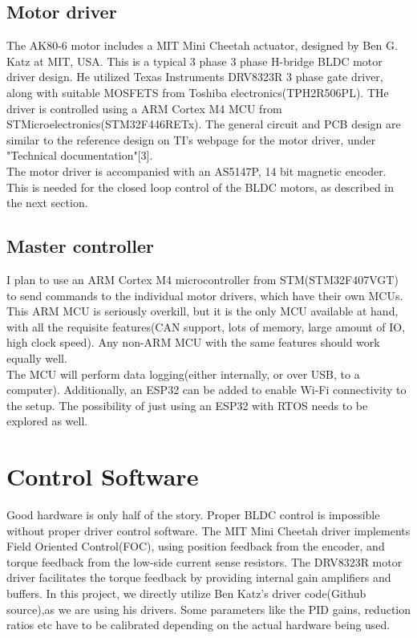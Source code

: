 \documentclass[a4paper]{article}
\begin{document}
		\subsection{Motor driver}
			The AK80-6 motor includes a MIT Mini Cheetah actuator, designed by Ben G. Katz at MIT, USA. This is a typical 3 phase 3 phase H-bridge BLDC motor driver design. He utilized Texas Instruments DRV8323R 3 phase gate driver, along with suitable MOSFETS from Toshiba electronics(TPH2R506PL). THe driver is controlled using a ARM Cortex M4 MCU from STMicroelectronics(STM32F446RETx). The general circuit and PCB design are similar to the reference design on TI's webpage for the motor driver, under "Technical documentation"[3].\\

			The motor driver is accompanied with an AS5147P, 14 bit magnetic encoder. This is needed for the closed loop control of the BLDC motors, as described in the next section.
		\subsection{Master controller}
			I plan to use an ARM Cortex M4 microcontroller from STM(STM32F407VGT) to send commands to the individual motor drivers, which have their own MCUs. This ARM MCU is seriously overkill, but it is the only MCU available at hand, with all the requisite features(CAN support, lots of memory, large amount of IO, high clock speed). Any non-ARM MCU with the same features should work equally well.\\

			The MCU will perform data logging(either internally, or over USB, to a computer). Additionally, an ESP32 can be added to enable Wi-Fi connectivity to the setup. The possibility of just using an ESP32 with RTOS needs to be explored as well.

	\section{Control Software}
		Good hardware is only half of the story. Proper BLDC control is impossible without proper driver control software. The MIT Mini Cheetah driver implements Field Oriented Control(FOC), using position feedback from the encoder, and torque feedback from the low-side current sense resistors. The DRV8323R motor driver facilitates the torque feedback by providing internal gain amplifiers and buffers. In this project, we directly utilize Ben Katz's driver code(Github source),as we are using his drivers. Some parameters like the PID gains, reduction ratios etc have to be calibrated depending on the actual hardware being used.\\
\end{document}
